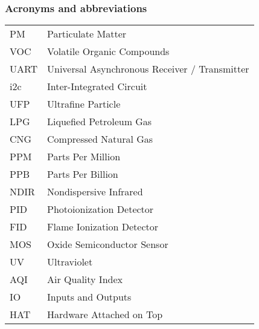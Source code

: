 \subsubsection*{Acronyms and abbreviations}

\begingroup
\renewcommand{\arraystretch}{1.2}
\begin{tabular}{@{}p{2.5cm} l}

	PM		& Particulate Matter\\
	VOC		& Volatile Organic Compounds\\
	UART	& Universal Asynchronous Receiver / Transmitter\\
	i2c		& Inter-Integrated Circuit\\
	UFP		& Ultrafine Particle\\
	LPG		& Liquefied Petroleum Gas\\
	CNG 	& Compressed Natural Gas\\
	PPM		& Parts Per Million\\
	PPB		& Parts Per Billion\\
	NDIR	& Nondispersive Infrared\\
	PID		& Photoionization Detector\\
	FID		& Flame Ionization Detector\\
	MOS		& Oxide Semiconductor Sensor\\
	UV		& Ultraviolet\\
	AQI		& Air Quality Index\\
	IO		& Inputs and Outputs\\
	HAT		& Hardware Attached on Top\\
	
\end{tabular}
\endgroup
